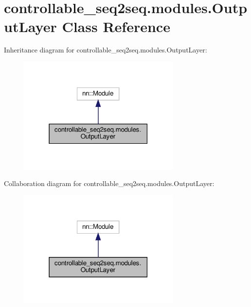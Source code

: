\hypertarget{classcontrollable__seq2seq_1_1modules_1_1OutputLayer}{}\section{controllable\+\_\+seq2seq.\+modules.\+Output\+Layer Class Reference}
\label{classcontrollable__seq2seq_1_1modules_1_1OutputLayer}


Inheritance diagram for controllable\+\_\+seq2seq.\+modules.\+Output\+Layer\+:
\nopagebreak
\begin{figure}[H]
\begin{center}
\leavevmode
\includegraphics[width=231pt]{classcontrollable__seq2seq_1_1modules_1_1OutputLayer__inherit__graph}
\end{center}
\end{figure}


Collaboration diagram for controllable\+\_\+seq2seq.\+modules.\+Output\+Layer\+:
\nopagebreak
\begin{figure}[H]
\begin{center}
\leavevmode
\includegraphics[width=231pt]{classcontrollable__seq2seq_1_1modules_1_1OutputLayer__coll__graph}
\end{center}
\end{figure}
